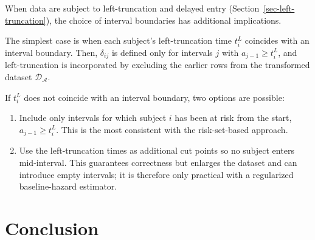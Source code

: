 \documentclass[
  letterpaper,
  krantz2]{style/krantz}
\providecommand{\tightlist}{%
  \setlength{\itemsep}{0pt}\setlength{\parskip}{0pt}}
\begin{document}
When data are subject to left-truncation and delayed entry
(Section~\ref{sec-left-truncation}), the choice of interval boundaries
has additional implications.

The simplest case is when each subject's left-truncation time \(t_i^L\)
coincides with an interval boundary. Then, \(\delta_{ij}\) is defined
only for intervals \(j\) with \(a_{j-1} \geq t_i^L\), and
left-truncation is incorporated by excluding the earlier rows from the
transformed dataset \(\mathcal{D}_{\mathcal{A}}\).

If \(t_i^L\) does not coincide with an interval boundary, two options
are possible:

\begin{enumerate}
\def\labelenumi{\arabic{enumi}.}
\tightlist
\item
  Include only intervals for which subject \(i\) has been at risk from
  the start, \(a_{j-1} \geq t_i^L\). This is the most consistent with
  the risk-set-based approach.
\item
  Use the left-truncation times as additional cut points so no subject
  enters mid-interval. This guarantees correctness but enlarges the
  dataset and can introduce empty intervals; it is therefore only
  practical with a regularized baseline-hazard estimator.
\end{enumerate}

\section{Conclusion}\label{conclusion-15}
\end{document}
